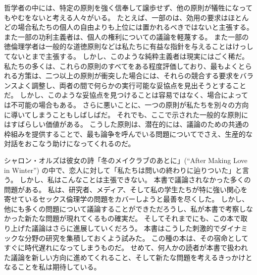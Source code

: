 \documentclass[paper=a4,book,openany]{jlreq}
\begin{document}
哲学者の中には、特定の原則を強く信奉して譲歩せず、他の原則が犠牲になってもやむをないと考える人々がいる。
たとえば、一部のは、効用の要求はほとんどの場合私たちの個人の自由よりも上位には置かれるべきではないと主張する。
また一部の功利主義者は、個人の権利についての議論を軽蔑する。
また一部の徳倫理学者は一般的な道徳原則などは私たちに有益な指針を与えることはけっしてないとまで主張する。
しかし、このような純粋主義者は現実にはごく稀だ。
私たちの多くは、これらの原則のすべてをある程度評価しており、最もよくとられる方策は、二つ以上の原則が衝突した場合には、それらの競合する要求をバランスよく調整し、両者の間で何らかの実行可能な妥協点を見出そうとすることだ。
しかし、このような妥協点を見つけることは容易ではなく、場合によっては不可能の場合もある。
さらに悪いことに、一つの原則が私たちを別々の方向に導いてしまうこともしばしばだ。
それでも、ここで示された一般的な原則にはすばらしい価値がある。
こうした原則は、潜在的には、議論のための共通の枠組みを提供することで、最も論争を呼んでいる問題についてでさえ、生産的な対話をおこなう助けになってくれるのだ。

\vspace{1\zw}

シャロン・オルズは彼女の詩「冬のメイクラブのあとに」(``After Making Love in Winter'') の中で、恋人に対して「私たちは問いの終わりに辿りついた」と言う。
しかし、私はこんなことは主張できない。
本書で議論されなかった多くの問題がある。
私は、研究者、メディア、そして私の学生たちが特に強い関心を寄せているセックス倫理学の問題をカバーしようと最善を尽くした。
しかし、他にも多くの問題について議論することができただろうし、私が本書で考察しなかった新たな問題が現れてくるもの確実だ。
そしてそれまでにも、この本で取り上げた議論はさらに進展していくだろう。
本書はこうした刺激的でダイナミックな分野の研究を集積しておくよう試みた。
この種の本は、その宿命としてすぐに時代遅れになってしまうものだ。
せめて、何人かの読者が本書で扱われた議論を新しい方向に進めてくれること、そして新たな問題を考えるきっかけとなることを私は期待している。

\end{document}
